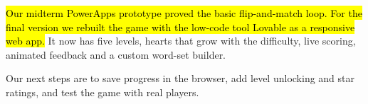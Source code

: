 \documentclass[11pt,a4paper]{article}
\begin{document}
\hl{Our midterm PowerApps prototype proved the basic flip-and-match loop. For the final version we rebuilt the game with the low-code tool Lovable as a responsive web app.} It now has five levels, hearts that grow with the difficulty, live scoring, animated feedback and a custom word-set builder.

Our next steps are to save progress in the browser, add level unlocking and star ratings, and test the game with real players.
\end{document}
